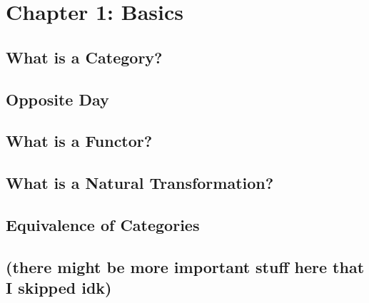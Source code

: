 \section{Chapter 1: Basics}

\subsection{What is a Category?}

\subsection{Opposite Day}

\subsection{What is a Functor?}

\subsection{What is a Natural Transformation?}

\subsection{Equivalence of Categories}

\subsection{(there might be more important stuff here that I skipped idk)}